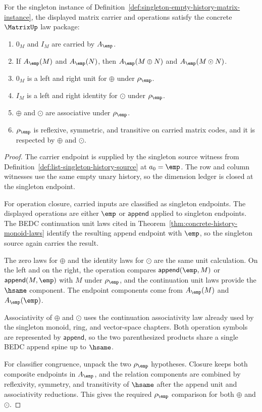 \begin{theorem}
\label{thm:singleton-empty-history-matrix-laws}
For the singleton instance of
Definition~\ref{def:singleton-empty-history-matrix-instance}, the displayed
matrix carrier and operations satisfy the concrete $\MatrixUp$ law package:
\begin{enumerate}
  \item $0_M$ and $I_M$ are carried by $A_{\emp}$.
  \item If $A_{\emp}(M)$ and $A_{\emp}(N)$, then
  $A_{\emp}(M\oplus N)$ and $A_{\emp}(M\odot N)$.
  \item $0_M$ is a left and right unit for $\oplus$ under $\rho_{\emp}$.
  \item $I_M$ is a left and right identity for $\odot$ under $\rho_{\emp}$.
  \item $\oplus$ and $\odot$ are associative under $\rho_{\emp}$.
  \item $\rho_{\emp}$ is reflexive, symmetric, and transitive on carried
  matrix codes, and it is respected by $\oplus$ and $\odot$.
\end{enumerate}
\end{theorem}
\begin{proof}
The carrier endpoint is supplied by the singleton source witness from
Definition~\ref{def:list-singleton-history-source} at $a_0=\emp$. The row and
column witnesses use the same empty unary history, so the dimension ledger is
closed at the singleton endpoint.

For operation closure, carried inputs are classified as singleton endpoints.
The displayed operations are either $\emp$ or $\mathsf{append}$ applied to
singleton endpoints. The BEDC continuation unit laws cited in
Theorem~\ref{thm:concrete-history-monoid-laws} identify the resulting append
endpoint with $\emp$, so the singleton source again carries the result.

The zero laws for $\oplus$ and the identity laws for $\odot$ are the same
unit calculation. On the left and on the right, the operation compares
$\mathsf{append}(\emp,M)$ or $\mathsf{append}(M,\emp)$ with $M$ under
$\rho_{\emp}$, and the continuation unit laws provide the $\hsame$ component.
The endpoint components come from $A_{\emp}(M)$ and $A_{\emp}(\emp)$.

Associativity of $\oplus$ and $\odot$ uses the continuation associativity law
already used by the singleton monoid, ring, and vector-space chapters. Both
operation symbols are represented by $\mathsf{append}$, so the two
parenthesized products share a single BEDC append spine up to $\hsame$.

For classifier congruence, unpack the two $\rho_{\emp}$ hypotheses. Closure
keeps both composite endpoints in $A_{\emp}$, and the relation components are
combined by reflexivity, symmetry, and transitivity of $\hsame$ after the
append unit and associativity reductions. This gives the required
$\rho_{\emp}$ comparison for both $\oplus$ and $\odot$.
\end{proof}

